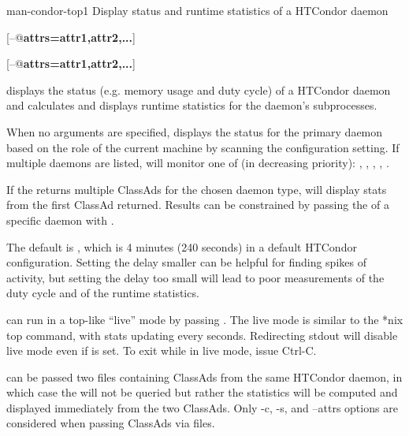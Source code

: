\begin{ManPage}{}{man-condor-top}{1}
{Display status and runtime statistics of a HTCondor daemon}


\Synopsis {}

[\verb@--@\textbf{attrs=\lt{}attr1,attr2,...\gt{}}]

[\verb@--@\textbf{attrs=\lt{}attr1,attr2,...\gt{}}]

\Description
{} displays the status 
(e.g. memory usage and duty cycle) 
of a HTCondor daemon
and calculates and displays runtime statistics 
for the daemon's subprocesses.

When no arguments are specified,
 displays the status 
for the primary daemon
based on the role of the current machine
by scanning the 
configuration setting.
If multiple daemons are listed,
 will monitor one of (in decreasing priority): 
, 
, 
, 
, 
.

If the  returns multiple ClassAds 
for the chosen daemon type,
 will display stats from the first ClassAd returned.
Results can be constrained
by passing the  of a specific daemon with .

The default  is ,
which is 4 minutes (240 seconds)
in a default HTCondor configuration.
Setting the delay smaller 
can be helpful 
for finding spikes of activity,
but setting the delay too small
will lead to poor measurements
of the duty cycle
and of the runtime statistics.

 can run in a top-like ``live'' mode
by passing .
The live mode is similar to the *nix top command,
with stats updating every  seconds.
Redirecting stdout will disable live mode
even if  is set.
To exit  while in live mode,
issue Ctrl-C.

 can be passed two files containing ClassAds
from the same HTCondor daemon,
in which case the  will not be queried
but rather the statistics will be computed and displayed immediately
from the two ClassAds.
Only -c, -s, and --attrs options are considered 
when passing ClassAds via files.


\end{ManPage}

